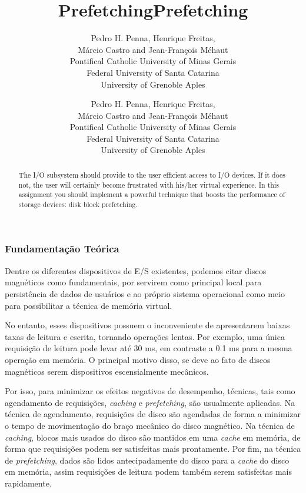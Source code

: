 \documentclass[11pt]{article}
\title{Prefetching}
\author{
	Pedro H. Penna, Henrique Freitas,\\%
	Márcio Castro and Jean-François Méhaut\\[0.3em]
	\small Pontifical Catholic University of Minas Gerais\\
	\small Federal University of Santa Catarina\\
	\small University of Grenoble Aples}
\date{}
\title{Prefetching}
\author{
	Pedro H. Penna, Henrique Freitas,\\%
	Márcio Castro and Jean-François Méhaut\\[0.3em]
	\small Pontifical Catholic University of Minas Gerais\\
	\small Federal University of Santa Catarina\\
	\small University of Grenoble Aples}
\date{}
\newif\ifbr
\newif\ifen
\begin{document}
\maketitle

\begin{abstract}

\ifbr
	\noindent O subsistema de E/S deve prover ao usuário acesso
	eficiente aos dispositivos de E/S. Se isso não ocorrer, o usuário
	certamente ficará frustrado com a sua experiência virtual. Nesse
	projeto você implementará uma técnica que significativamente
	potencializa o desempenho de dispositivos de armazenamento em massa,
	o \textit{prefetching}.
\else\ifen
	\noindent The I/O subsystem should provide to the user efficient
	access to I/O devices. If it does not, the user will certainly
	become frustrated with his/her virtual experience. In this
	assignment you should implement a powerful technique that boosts the
	performance of storage devices: disk block prefetching.
\fi\fi


\end{abstract}

\ifbr
	\subsubsection*{Fundamentação Teórica}

		Dentre os diferentes dispositivos de E/S existentes, podemos
		citar discos magnéticos como fundamentais, por servirem como
		principal local para persistência de dados de usuários e ao
		próprio sistema operacional como meio para possibilitar a
		técnica de memória virtual.

		No entanto, esses dispositivos possuem o inconveniente de
		apresentarem baixas taxas de leitura e escrita, tornando
		operações lentas. Por exemplo, uma única requisição de leitura
		pode levar até 30 ms, em contraste a 0.1 ms para a mesma
		operação em memória. O principal motivo disso, se deve ao fato
		de discos magnéticos serem dispositivos escensialmente
		mecânicos.

		Por isso, para minimizar os efeitos negativos de desempenho,
		técnicas, tais como agendamento de requisições, \textit{caching}
		e \textit{prefetching}, são usualmente aplicadas. Na técnica de
		agendamento, requisições de disco são agendadas de forma a
		minimizar o tempo de movimentação do braço mecânico do disco
		magnético. Na técnica de \textit{caching}, blocos mais usados do
		disco são mantidos em uma \textit{cache} em memória, de forma
		que requisições podem ser satisfeitas mais prontamente. Por fim,
		na técnica de \textit{prefetching}, dados são lidos
		antecipadamente do disco para a \textit{cache} do disco em
		memória, assim requisições de leitura podem também serem
		satisfeitas mais rapidamente.
\end{document}
